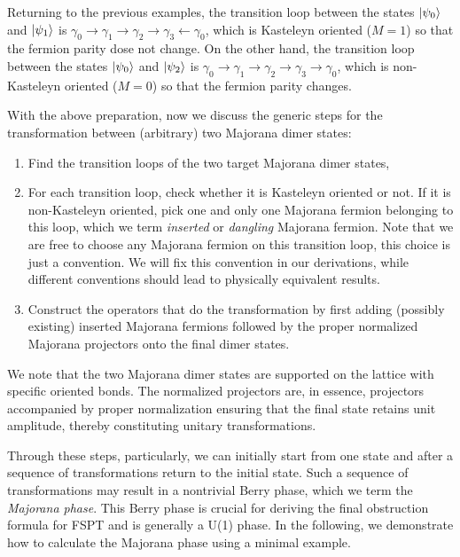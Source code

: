 \documentclass[%
 reprint,
 amsmath,amssymb,
 aps,
prb,
]{revtex4-2}
\begin{document}
Returning to the previous examples, the transition loop between the states $\ket{\psi_0}$ and $\ket{\psi_1}$ is $\gamma_0 \rightarrow \gamma_1 \rightarrow \gamma_2 \rightarrow \gamma_3 \leftarrow \gamma_0$, which is Kasteleyn oriented ($M = 1$) so that the fermion parity dose not change.
On the other hand, the transition loop between the states $\ket{\psi_0}$ and $\ket{\psi_2}$ is $\gamma_0 \rightarrow \gamma_1 \rightarrow \gamma_2 \rightarrow \gamma_3 \rightarrow \gamma_0$, which is non-Kasteleyn oriented ($M = 0$) so that the fermion parity changes.

With the above preparation, now we discuss the generic steps for the transformation between  (arbitrary) two Majorana dimer states:
\begin{enumerate}
\item Find the transition loops of the two target Majorana dimer states, 
\item For each transition loop, check whether it is Kasteleyn oriented or not.  If it is non-Kasteleyn oriented,  pick one and only one Majorana fermion belonging to this loop, which we term \textit{inserted} or \textit{dangling} Majorana fermion.
Note that we are free to choose any Majorana fermion on this transition loop, this choice is just a convention.
We will fix this convention in our derivations, while different conventions should lead to physically equivalent results.
\item Construct the operators that do the transformation by first adding (possibly existing) inserted Majorana fermions followed by the proper normalized Majorana projectors onto the final dimer states.
\end{enumerate}
We note that the two Majorana dimer states are supported on the lattice with specific oriented bonds. The normalized projectors are, in essence, projectors accompanied by proper normalization ensuring that the final state retains unit amplitude, thereby constituting unitary transformations.

Through these steps, particularly, we can initially start from one state and after a sequence of transformations return to the initial state.
Such a sequence of transformations may result in a nontrivial Berry phase, which we term the \textit{Majorana phase}.
This Berry phase is crucial for deriving the final obstruction formula for FSPT and is generally a U(1) phase.
In the following, we demonstrate how to calculate the Majorana phase using a minimal example.
\end{document}
